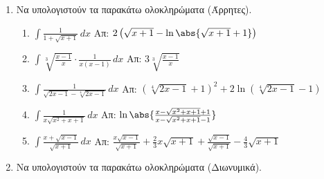 


\everymath{\displaystyle}
\thispagestyle{empty}



\begin{center}
  \minibox{\large\bfseries \textcolor{Col1}{Ολοκληρώματα}}
\end{center}

\vspace{\baselineskip}

\begin{enumerate}
	\item Να υπολογιστούν τα παρακάτω ολοκληρώματα (Άρρητες).
		
		\begin{enumerate}
			\item $ \int \frac{1}{1 + \sqrt{x+1}} \,{dx} $ \hfill Απ: $
				2\left(\sqrt{x+1} - \ln{\abs{\sqrt{x+1} + 1}}\right) $
		\item $ \int \sqrt[3]{\frac{x-1}{x}} \cdot \frac{1}{x(x-1)} \,{dx} $
				\hfill Απ: $ 3 \sqrt[3]{\frac{x-1}{x}} $
			\item $ \int \frac{1}{\sqrt{2x-1} - \sqrt[4]{2x-1}} \,{dx} $ \hfill
				Απ:	$ \left(\sqrt[4]{2x-1} + 1\right)^{2} + 2 \ln{\left(\sqrt[4]{2x-1} - 1\right)} $
			\item $ \int \frac{1}{x \sqrt{x^{2}+x+1}} \,{dx} $ \hfill Απ: $
				\ln{\abs{\frac{x - \sqrt{x^{2}+x+1} +1}{x - \sqrt{x^{2}+x+1} -1}}} $
			\item $ \int \frac{x + \sqrt{x-1}}{\sqrt{x+1}} \,{dx} $ \hfill Απ: $
				\frac{x \sqrt{x-1}}{\sqrt{x+1}} + \frac{2}{3} x \sqrt{x+1} +
		\frac{\sqrt{x-1}}{\sqrt{x+1}} - \frac{4}{3} \sqrt{x+1}  $
		\end{enumerate}

	\item Να υπολογιστούν τα παρακάτω ολοκληρώματα (Διωνυμικά).


\end{enumerate}
